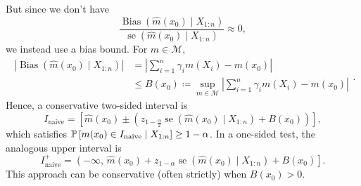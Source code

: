 But since we don't have
\[
	\frac{\operatorname{Bias}\left(\hat{m}(x_0) \mid X_{1:n}\right)}{\operatorname{se}\left(\hat{m}(x_0) \mid X_{1:n}\right)} \approx 0
,\]
we instead use a bias bound. For $m \in \mathscr{M}$,
\[
	\begin{aligned}
		\left|\operatorname{Bias}\left(\hat{m}(x_0) \mid X_{1:n}\right)\right|
		&= \left|\sum\limits_{i=1}^{n} \gamma_i m(X_i) - m(x_0)\right| \\
		&\le B(x_0) \coloneqq \sup_{m \in \mathscr{M}} \left|\sum\limits_{i=1}^{n} \gamma_i m(X_i) - m(x_0)\right|
	\end{aligned}
.\]
Hence, a conservative two-sided interval is
\[
	I_{\mathrm{naive}}
	= \left[\hat{m}(x_0) \pm \left( z_{1-\frac{\alpha}{2}} \operatorname{se}\left(\hat{m}(x_0) \mid X_{1:n}\right) + B(x_0) \right)\right]
,\]
which satisfies $\P\left[m(x_0) \in I_{\mathrm{naive}} \mid X_{1:n}\right] \ge 1-\alpha$.
In a one-sided test, the analogous upper interval is
\[
	I_{\mathrm{naive}}^{+}
	= \left(-\infty,\, \hat{m}(x_0) + z_{1-\alpha}\operatorname{se}\left(\hat{m}(x_0) \mid X_{1:n}\right) + B(x_0)\right]
.\]
This approach can be conservative (often strictly) when $B(x_0) > 0$.


